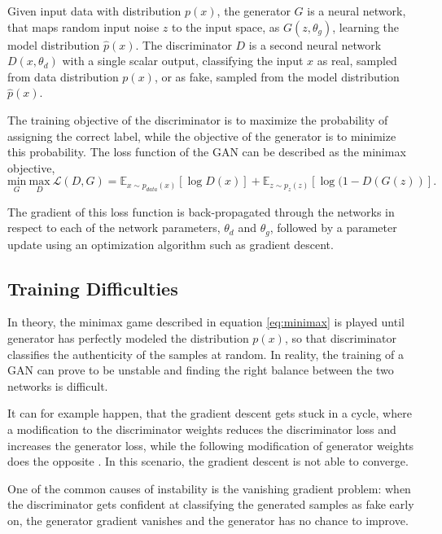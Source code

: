 \documentclass[12pt]{report}
\begin{document}
Given input data with distribution $p(x)$, the generator $G$ is a neural network, that maps random input noise $z$ to the input space, as $G(z, \theta_{g})$, learning the model distribution $\hat{p}(x)$. The discriminator $D$ is a second neural network $D(x, \theta_{d})$ with a single scalar output, classifying the input $x$ as real, sampled from data distribution $p(x)$, or as fake, sampled from the model distribution $\hat{p}(x)$. 

The training objective of the discriminator is to maximize the probability of assigning the correct label, while the objective of the generator is to minimize this probability. The loss function of the GAN can be described as the minimax objective,
\begin{equation}
\underset{G}{\mathrm{min}} \ \underset{D}{\mathrm{max}} \ \mathcal{L}(D,G) = \mathbb{E}_{x \sim p_{data}(x)}[\log D(x)] + \mathbb{E}_{z \sim p_{z}(z)}[\log (1 - D(G(z))].
\label{eq:minimax}
\end{equation}

The gradient of this loss function is back-propagated through the networks in respect to each of the network parameters, $\theta_{d}$ and $\theta_{g}$, followed by a parameter update using an optimization algorithm such as gradient descent.

\subsection{Training Difficulties} \label{sec:gan_diff}

In theory, the minimax game described in equation \ref{eq:minimax} is played until generator has perfectly modeled the distribution $p(x)$, so that discriminator classifies the authenticity of the samples at random. In reality, the training of a GAN can prove to be unstable and finding the right balance between the two networks is difficult.

It can for example happen, that the gradient descent gets stuck in a cycle, where a modification to the discriminator weights reduces the discriminator loss and increases the generator loss, while the following modification of generator weights does the opposite \cite{salimans_improved_2016}. In this scenario, the gradient descent is not able to converge.

One of the common causes of instability is the vanishing gradient problem: when the discriminator gets confident at classifying the generated samples as fake early on, the generator gradient vanishes and the generator has no chance to improve. 
\end{document}
